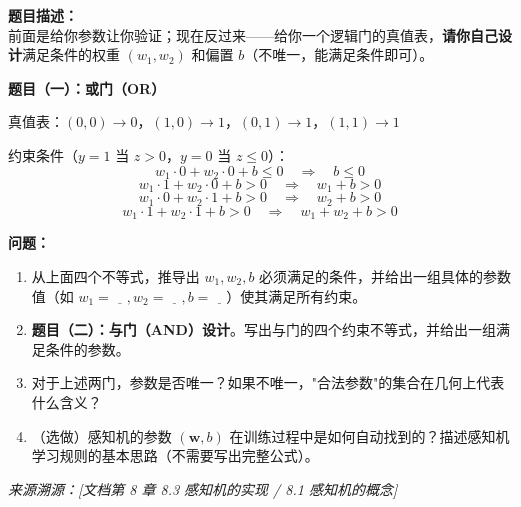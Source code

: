 \documentclass[a4paper,11pt]{ctexart}
\begin{document}
\begin{problembox}
    \textbf{题目描述：}\\
    前面是给你参数让你验证；现在反过来——给你一个逻辑门的真值表，\textbf{请你自己设计}满足条件的权重 $(w_1, w_2)$ 和偏置 $b$（不唯一，能满足条件即可）。

    \vspace{0.3cm}
    \textbf{题目（一）：或门（OR）}

    真值表：$(0,0)\to 0$，$(1,0)\to 1$，$(0,1)\to 1$，$(1,1)\to 1$

    约束条件（$y = 1$ 当 $z > 0$，$y = 0$ 当 $z \leq 0$）：
    \[
    w_1 \cdot 0 + w_2 \cdot 0 + b \leq 0 \quad \Rightarrow \quad b \leq 0
    \]
    \[
    w_1 \cdot 1 + w_2 \cdot 0 + b > 0 \quad \Rightarrow \quad w_1 + b > 0
    \]
    \[
    w_1 \cdot 0 + w_2 \cdot 1 + b > 0 \quad \Rightarrow \quad w_2 + b > 0
    \]
    \[
    w_1 \cdot 1 + w_2 \cdot 1 + b > 0 \quad \Rightarrow \quad w_1 + w_2 + b > 0
    \]

    \vspace{0.2cm}
    \textbf{问题：}
    \begin{enumerate}[(1)]
        \item 从上面四个不等式，推导出 $w_1, w_2, b$ 必须满足的条件，并给出一组具体的参数值（如 $w_1 = \underline{\quad}, w_2 = \underline{\quad}, b = \underline{\quad}$）使其满足所有约束。

        \item \textbf{题目（二）：与门（AND）设计}。写出与门的四个约束不等式，并给出一组满足条件的参数。

        \item 对于上述两门，参数是否唯一？如果不唯一，"合法参数"的集合在几何上代表什么含义？

        \item （选做）感知机的参数 $(\mathbf{w}, b)$ 在训练过程中是如何自动找到的？描述感知机学习规则的基本思路（不需要写出完整公式）。
    \end{enumerate}

    \vspace{0.2cm}
    {\color{gray}\small\textit{来源溯源：[文档第 8 章 8.3 感知机的实现 / 8.1 感知机的概念]}}
\end{problembox}
\end{document}
